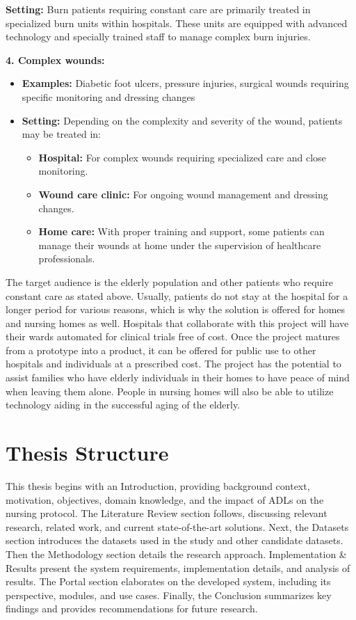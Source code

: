 \textbf{Setting:} Burn patients requiring constant care are primarily treated in specialized burn units within hospitals. These units are equipped with advanced technology and specially trained staff to manage complex burn injuries.

\textbf{4. Complex wounds:}

\begin{itemize}
    \item \textbf{Examples:} Diabetic foot ulcers, pressure injuries, surgical wounds requiring specific monitoring and dressing changes
    \item \textbf{Setting:} Depending on the complexity and severity of the wound, patients may be treated in: 

\begin{itemize}
        \item \textbf{Hospital:} For complex wounds requiring specialized care and close monitoring.
        \item \textbf{Wound care clinic:} For ongoing wound management and dressing changes.
        \item \textbf{Home care:} With proper training and support, some patients can manage their wounds at home under the supervision of healthcare professionals.
\end{itemize}

\end{itemize}

The target audience is the elderly population and other patients who require constant care as stated above. Usually, patients do not stay at the hospital for a longer period for various reasons, which is why the solution is offered for homes and nursing homes as well. Hospitals that collaborate with this project will have their wards automated for clinical trials free of cost. Once the project matures from a prototype into a product, it can be offered for public use to other hospitals and individuals at a prescribed cost. The project has the potential to assist families who have elderly individuals in their homes to have peace of mind when leaving them alone. People in nursing homes will also be able to utilize technology aiding in the successful aging of the elderly.

\section{Thesis Structure}
This thesis begins with an Introduction, providing background context, motivation, objectives, domain knowledge, and the impact of ADLs on the nursing protocol. The Literature Review section follows, discussing relevant research, related work, and current state-of-the-art solutions. Next, the Datasets section introduces the datasets used in the study and other candidate datasets. Then the Methodology section details the research approach. Implementation \& Results present the system requirements, implementation details, and analysis of results. The Portal section elaborates on the developed system, including its perspective, modules, and use cases. Finally, the Conclusion summarizes key findings and provides recommendations for future research.
